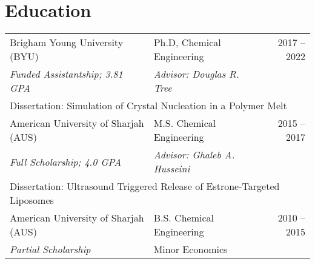 \documentclass[letterpaper,11pt]{article}
\begin{document}
\section*{Education}
\begin{tabular}{@{}p{} p{} r@{}}
     Brigham Young University (BYU)           & Ph.D, Chemical Engineering & 2017 -- 2022 \\
     \multicolumn{1}{l}{\emph{Funded Assistantship; 3.81 GPA}}    & \emph{Advisor: Douglas R. Tree} & \\
     \multicolumn{3}{l}{Dissertation: Simulation of Crystal Nucleation in a Polymer Melt}\\
     [4pt]

     American University of Sharjah (AUS)     & M.S. Chemical Engineering & 2015 -- 2017 \\
     \multicolumn{1}{l}{\emph{Full Scholarship; 4.0 GPA}}               & \emph{Advisor: Ghaleb A. Husseini} & \\
     \multicolumn{3}{l}{Dissertation: Ultrasound Triggered Release of Estrone-Targeted Liposomes}\\
      [4pt]

     American University of Sharjah (AUS)     & B.S. Chemical Engineering  & 2010 -- 2015 \\
     \multicolumn{1}{l}{\emph{Partial Scholarship}}                  & Minor Economics
\end{tabular}

\end{document}
